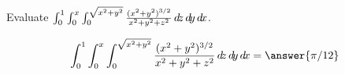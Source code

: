 \documentclass{ximera}
\author{David Guichard \and Neal Koblitz \and H. Jerome Keisler \and Albert Scheller \and Barry Balof \and Mike Wills \and Matthew Carr}
\begin{document}
\begin{exercise}




Evaluate $\int_{0}^{1}\int_{0}^{x}\int_{0}^{\sqrt{x^2+y^2}}\frac{(x^2+y^2)^{3/2}}{x^2+y^2+z^2}\mathop{}\!d\! z\mathop{}\!d\! y \mathop{}\!d\! x$.

\begin{prompt}
\[
\int_{0}^{1}\int_{0}^{x}\int_{0}^{\sqrt{x^2+y^2}}\frac{(x^2+y^2)^{3/2}}{x^2+y^2+z^2}\d z\d y \d x=\answer{\pi/12}
\]
\end{prompt}



\end{exercise}
\end{document}
